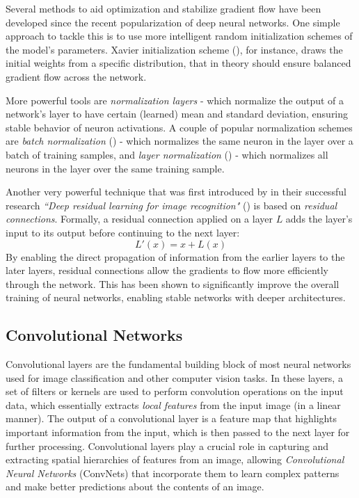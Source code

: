 \documentclass{article}
\begin{document}
\medskip
\noindent
Several methods to aid optimization and stabilize gradient flow have been developed since the recent popularization of deep neural networks. One simple approach to tackle this is to use more intelligent random initialization schemes of the model's parameters. Xavier initialization scheme (\citet{glorot2010xavier}), for instance, draws the initial weights from a specific distribution, that in theory should ensure balanced gradient flow across the network.

\medskip
\noindent
More powerful tools are \emph{normalization layers} - which normalize the output of a network's layer to have certain (learned) mean and standard deviation, ensuring stable behavior of neuron activations. A couple of popular normalization schemes are \emph{batch normalization} (\citet{ioffe2015batch}) - which normalizes the same neuron in the layer over a batch of training samples, and \emph{layer normalization} (\citet{ba2016layer}) - which normalizes all neurons in the layer over the same training sample.

\medskip
\noindent
Another very powerful technique that was first introduced by \citet{he2016deep} in their successful research \emph{``Deep residual learning for image recognition"} (\citeyear{he2016deep}) is based on \emph{residual connections}. Formally, a residual connection applied on a layer $L$ adds the layer's input to its output before continuing to the next layer:
\begin{equation*}
    L'(x) = x + L(x)
\end{equation*}
By enabling the direct propagation of information from the earlier layers to the later layers, residual connections allow the gradients to flow more efficiently through the network. This has been shown to significantly improve the overall training of neural networks, enabling stable networks with deeper architectures.



\subsection{Convolutional Networks}
\label{sec:convnets}

Convolutional layers are the fundamental building block of most neural networks used for image classification and other computer vision tasks. In these layers, a set of filters or kernels are used to perform convolution operations on the input data, which essentially extracts \emph{local features} from the input image (in a linear manner). The output of a convolutional layer is a feature map that highlights important information from the input, which is then passed to the next layer for further processing. Convolutional layers play a crucial role in capturing and extracting spatial hierarchies of features from an image, allowing \emph{Convolutional Neural Networks} (ConvNets) that incorporate them to learn complex patterns and make better predictions about the contents of an image.
\end{document}
